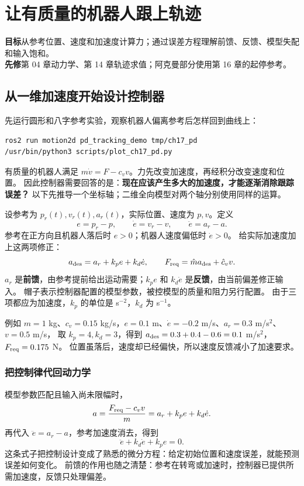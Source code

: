 \chapter{让有质量的机器人跟上轨迹}
\begin{notebox}
\textbf{目标}\quad 从参考位置、速度和加速度计算力；通过误差方程理解前馈、反馈、模型失配和输入饱和。\\
\textbf{先修}\quad 第 04 章动力学、第 14 章轨迹求值；阿克曼部分使用第 16 章的起停参考。
\end{notebox}
\section{从一维加速度开始设计控制器}
先运行圆形和八字参考实验，观察机器人偏离参考后怎样回到曲线上：
\begin{lstlisting}[language=bash,numbers=none]
ros2 run motion2d pd_tracking_demo tmp/ch17_pd
/usr/bin/python3 scripts/plot_ch17_pd.py
\end{lstlisting}
有质量的机器人满足 $m\dot v=F-c_vv$。力先改变加速度，再经积分改变速度和位置。
因此控制器需要回答的是：\textbf{现在应该产生多大的加速度，才能逐渐消除跟踪误差？}
以下先推导一个坐标轴；二维全向模型对两个轴分别使用同样的运算。

设参考为 $p_r(t),v_r(t),a_r(t)$，实际位置、速度为 $p,v$。定义
\[
 e=p_r-p,\qquad \dot e=v_r-v,\qquad \ddot e=a_r-a.
\]
参考在正方向且机器人落后时 $e>0$；机器人速度偏低时 $\dot e>0$。
给实际加速度加上这两项修正：
\begin{equation}
 a_{\rm des}=a_r+k_pe+k_d\dot e,\qquad
 F_{\rm req}=\hat m a_{\rm des}+\hat c_vv.\label{eq:pdforce}
\end{equation}
$a_r$ 是\textbf{前馈}，由参考提前给出运动需要；$k_pe$ 和 $k_d\dot e$ 是\textbf{反馈}，由当前偏差修正输入。
帽子表示控制器配置的模型参数，被控模型的质量和阻力另行配置。
由于三项都应为加速度，$k_p$ 的单位是 s$^{-2}$，$k_d$ 为 s$^{-1}$。

例如 $m=1$ kg、$c_v=0.15$ kg/s，$e=0.1$ m、$\dot e=-0.2$ m/s、$a_r=0.3$ m/s$^2$、$v=0.5$ m/s，
取 $k_p=4,k_d=3$，得到 $a_{\rm des}=0.3+0.4-0.6=0.1$ m/s$^2$，$F_{\rm req}=0.175$ N。
位置虽落后，速度却已经偏快，所以速度反馈减小了加速要求。

\subsection{把控制律代回动力学}
模型参数匹配且输入尚未限幅时，
\[
 a=\frac{F_{\rm req}-c_vv}{m}
   =a_r+k_pe+k_d\dot e.
\]
再代入 $\ddot e=a_r-a$，参考加速度消去，得到
\begin{equation}
 \ddot e+k_d\dot e+k_pe=0.\label{eq:pderror}
\end{equation}
这条式子把控制设计变成了熟悉的微分方程：给定初始位置和速度误差，就能预测误差如何变化。
前馈的作用也随之清楚：参考在转弯或加速时，控制器已提供所需加速度，反馈只处理偏差。

